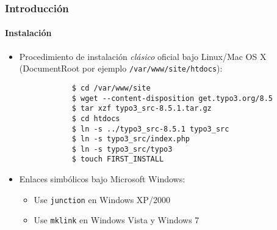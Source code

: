 \begin{frame}[fragile]
	\frametitle{Introducción}
	\framesubtitle{Instalación}

	\begin{itemize}
		\item Procedimiento de instalación \textit{clásico} oficial bajo Linux/Mac OS X\newline
			(DocumentRoot por ejemplo \texttt{/var/www/site/htdocs}):
		\begin{lstlisting}
			$ cd /var/www/site
			$ wget --content-disposition get.typo3.org/8.5
			$ tar xzf typo3_src-8.5.1.tar.gz
			$ cd htdocs
			$ ln -s ../typo3_src-8.5.1 typo3_src
			$ ln -s typo3_src/index.php
			$ ln -s typo3_src/typo3
			$ touch FIRST_INSTALL
		\end{lstlisting}

		\item Enlaces simbólicos bajo Microsoft Windows:

			\begin{itemize}
				\item Use \texttt{junction} en Windows XP/2000
				\item Use \texttt{mklink} en Windows Vista y Windows 7
			\end{itemize}

	\end{itemize}
\end{frame}

